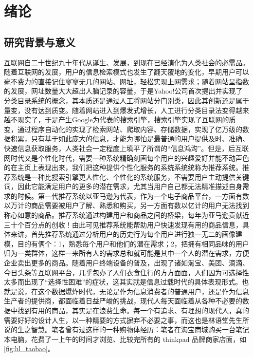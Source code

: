 ﻿
\chapter{绪论}
\label{chap:introduction}
\section{研究背景与意义}
	互联网自二十世纪九十年代从诞生、发展，到现在已经演化为人类社会的必需品。随着互联网的发展，用户的信息检索模式也发生了翻天覆地的变化，早期用户可以毫不费力的直接记住寥寥无几的网站、网址，轻松实现上网需求；随着网站呈指数的发展，网址数量大大超出人脑记录的容量，于是Yahoo!公司首次提出并实现了分类目录系统的概念，其本质还是通过人工将网站分门别类，因此其创新还是属于量变，没有达到质变。随着网站进入到爆发式增长，人工进行分类目录法变得越来越不现实了，于是产生Google为代表的搜索引擎，搜索引擎实现了互联网的质变，通过程序自动化的实现了检索网站、爬取内容、存储数据，实现了亿万级的数据积累，只有基于如此庞大的信息，才能为哪怕是最普通的用户提供及时、准确、快速信息获取服务，人类社会一定程度上填平了所谓的“信息鸿沟”。但是，后互联网时代又是个性化时代\citep{Personalization1,Personalization2,Personalization3,Personalization4,Personalization5,Personalization6,Personalization7,Personalization8,Personalization9}，需要一种系统精确刻画每个用户的兴趣爱好并能不动声色的在主页上表现出来，我们把这种提供个性化服务的系统系统统称为推荐系统。推荐系统是一种比搜索引擎更人性化、个性化的系统服务，不需要用户主动提供关键词，因此它能满足用户的更多的潜在需求，尤其当用户自己都无法精准描述自身需求的时候\citep{recmd-system}。第一代推荐系统以亚马逊为代表，作为一个电子商品平台，一方面有数以万计的商品需要被用户了解、熟悉和购买，另一方面有数以亿计的用户无法找到称心如意的商品。推荐系统通过构建用户和商品之间的桥梁，每年为亚马逊贡献近三十个百分点的创收！由此可见推荐系统能帮助用户快速发现有用的商品信息，具体来讲，首先推荐系统通过分析用户的历史行为每个用户进行独一无二的画像建模\citep{demo-data}，目的有俩个：1，熟悉每个用户和他们的潜在需求；2，把拥有相同品味的用户归为一类群体，这样一来所有人的需求总和就可能是其中一个人的潜在需求，方便企业卖出更多的商品。随着用户终端设备的普及，出现了诸如淘宝、美团、滴滴、今日头条等互联网平台，几乎包办了人们衣食住行的方方面面，人们因为可选择性太多而出现了“选择性困难”的症状，这其实就是信息过载时代的具体表现形式。也就是说，在这个数据爆炸时代，无论是作为信息消费者的普通用户，还是作为信息生产者的提供商，都面临着日益严峻的挑战，现代人每天面临着从各种不必要的数据中找到有用的商品，其实是在浪费生命。每一个有追求、有理想的现代人，真的需要好好的设计人生，以一种精要的方式摒弃不必要之事，而这也是林语堂先生所说的生之智慧。笔者曾有过这样的一种购物体经历：笔者在淘宝商城购买一台笔记本电脑，花费了一上午的时间才浏览、比较完所有的 thinkpad 品牌商家店面，如\autoref{fig:hl_taobao}。
